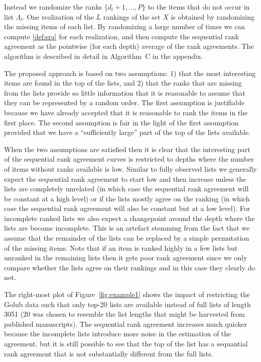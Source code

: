 \documentclass[oupdraft]{bio}
\newcommand{\added}[1]{{\color{added}{}#1}}
\begin{document}
Instead we randomize the ranks $\{d_{l}+1,\dots,P\}$ to the items that
do not occur in list $\Lambda_l$. One realization of the $L$ rankings
of the set $X$ is obtained by randomizing the missing items of each
list. By randomizing a large number of times we can compute
\eqref{def:sra} for each realization, and then compute the sequential
rank agreement as the pointwise (for each depth) average of the rank
agreements. The algorithm is described in detail in
Algorithm~C in the appendix.


The proposed approach is based on two assumptions: 1) that the most
interesting items are found in the top of the lists, and 2) that the
ranks that are missing from the lists provide so little information
that it is reasonable to assume that they can be represented by a
random order. The first assumption is justifiable because we have
already accepted that it is reasonable to rank the items in the first
place. The second assumption is fair in the light of the first
assumption provided that we have a ``sufficiently large'' part of the
top of the lists available.

When the two assumptions are satisfied then it is clear that the
interesting part of the sequential rank agreement curves is restricted
to depths where the number of items without ranks available is
low.
Similar to fully observed lists we generally expect the sequential
rank agreement to start low and then increase unless the lists are
completely unrelated (in which case the sequential rank agreement will
be constant at a high level) or if the lists mostly agree on the
ranking (in which case the sequential rank agreement will also be
constant but at a low level). For incomplete ranked lists we also
expect a changepoint around the depth where the lists are become
incomplete. This is an artefact stemming from the fact that we assume
that the remainder of the lists can be replaced by a simple
permutation of the missing items. \added{Note that if an item is
  ranked highly in a few lists but unranked in the remaining lists
  then it gets poor rank agreement since we only compare
  whether the lists agree on their rankings and in this case they
  clearly do not.}

The right-most plot of Figure~\ref{fig:example1} shows the impact
of restricting the Golub data such that only top-20 lists are
available instead of full lists of length 3051 (20 was chosen to
resemble the list lengths that might be harvested from published manuscripts). The sequential rank agreement increases much quicker
because the incomplete lists introduce more noise in the estimation of
the agreement, but it is still possible to see that the top of the
list has a sequantial rank agreement that is not substantially
different from the full lists.
\end{document}
